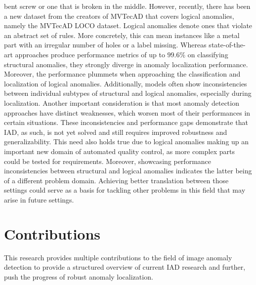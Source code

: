 bent screw or one that is broken in the middle. However, recently, there has been a new dataset from the creators of MVTecAD that covers logical 
anomalies, namely the MVTecAD LOCO \cite{LOCODentsAndScratchesBergmann2022} dataset. Logical anomalies denote ones that violate an abstract 
set of rules. More concretely, this can mean instances like a metal part with an irregular number of holes or a label missing. Whereas 
state-of-the-art approaches produce performance metrics of up to $99.6 \% $ on classifying structural anomalies, they 
strongly diverge in anomaly localization performance. Moreover, the performance plummets when approaching the classification and localization of logical 
anomalies. Additionally, models often show inconsistencies between individual subtypes of structural and logical anomalies, especially during 
localization. Another important consideration is that most anomaly detection approaches have distinct weaknesses, which worsen most 
of their performances in certain situations. These inconsistencies and performance gaps demonstrate that IAD, as such, is not yet solved and still requires improved 
robustness and generalizability. This need also holds true due to logical anomalies making up an important new domain of automated 
quality control, as more complex parts could be tested for requirements. Moreover, showcasing performance inconsistencies between 
structural and logical anomalies indicates the latter being of a different problem domain. Achieving better translation between those 
settings could serve as a basis for tackling other problems in this field that may arise in future settings.


\section{Contributions}
\label{sec:contributions}
This research provides multiple contributions to the field of image anomaly detection to provide a structured overview of current IAD research and 
further, push the progress of robust anomaly localization. 

